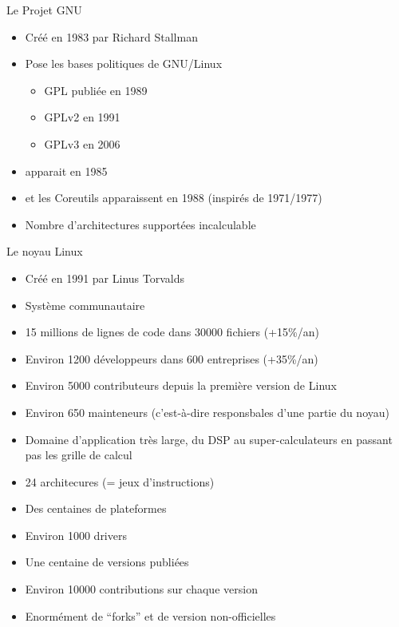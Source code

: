 \begin{frame}{Le Projet GNU}
  \begin{itemize}
  \item Créé en 1983 par Richard Stallman
  \item Pose  les bases politiques  de GNU/Linux
    \begin{itemize}
    \item GPL publiée en 1989
    \item GPLv2 en 1991
    \item GPLv3 en 2006
    \end{itemize}
  \item {} apparait en 1985
  \item {} et les  Coreutils apparaissent en 1988 (inspirés de
     1971/1977)
  \item Nombre d'architectures supportées incalculable
  \end{itemize}
\end{frame}

\begin{frame}{Le noyau Linux}
  \begin{itemize}
  \item Créé  en 1991 par  Linus Torvalds 
  \item Système communautaire 
  \item 15 millions de lignes de code dans 30000 fichiers (+15\%/an)
  \item Environ 1200 développeurs dans 600 entreprises (+35\%/an)
  \item Environ 5000 contributeurs depuis la première version de Linux
  \item  Environ  650  mainteneurs  (c'est-à-dire  responsbales  d'une
    partie du noyau)
  \item Domaine d'application très large, du DSP au super-calculateurs
    en passant pas les grille de calcul
  \item 24 architecures (= jeux d'instructions)
  \item Des centaines de plateformes
  \item Environ 1000 drivers
  \item Une centaine de versions publiées
  \item Environ 10000 contributions sur chaque version
  \item Enormément de ``forks'' et de version non-officielles
  \end{itemize}
\end{frame}

